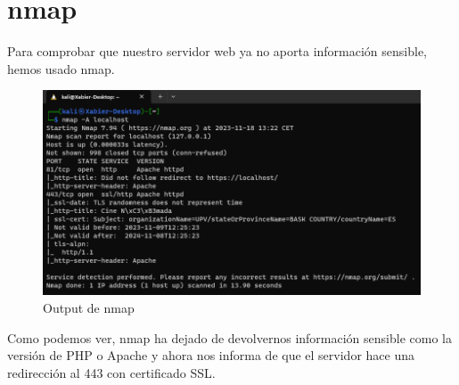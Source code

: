 \documentclass{report}
\begin{document}
        \section{nmap}
            Para comprobar que nuestro servidor web ya no aporta información sensible, hemos usado nmap.
            \begin{figure}[H]
                \centering
                \includegraphics[width=\textwidth]{./img/audit2/nmap1.png}
                \caption{Output de nmap}
            \end{figure}
            Como podemos ver, nmap ha dejado de devolvernos información sensible como la versión de PHP o Apache y ahora nos informa de que el servidor hace una redirección al 443 con certificado SSL.
        \clearpage
\end{document}
